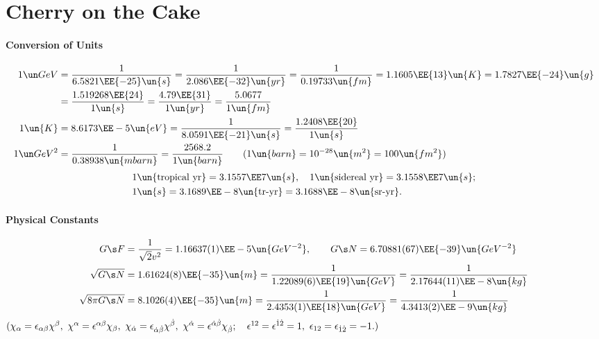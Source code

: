 
\section{Cherry on the Cake}
\paragraph{Conversion of Units}
\begin{align}
 1\GeV &= \frac1{6.5821\EE{-25}\un{s}} = \frac1{2.086\EE{-32}\un{yr}}
        = \frac1{0.19733\un{fm}}  = 1.1605\EE{13}\un{K} = 1.7827\EE{-24}\un{g}\notag\\
       &= \frac{1.519268\EE{24}}{1\un{s}} = \frac{4.79\EE{31}}{1\un{yr}}
        = \frac{5.0677}{1\un{fm}}\\
1\un{K}&= 8.6173\EE-5\un{eV} = \frac1{8.0591\EE{-21}\un{s}} = \frac{1.2408\EE{20}}{1\un{s}}\\
1\GeV^2&= \frac1{0.38938\un{mbarn}} = \frac{2568.2}{1\un{barn}}\qquad(1\un{barn}=10^{-28}\un{m^2} = 100\un{fm^2})
\end{align}
\vspace{-2zw}
\begin{equation}\begin{split}
 &1\un{\text{tropical yr}} = 3.1557\EE7\un{s},\quad 1\un{\text{sidereal yr}} = 3.1558\EE7\un{s};\\
 &1\un{s} = 3.1689\EE-8\un{\text{tr-yr}} = 3.1688\EE-8\un{\text{sr-yr}}.
\end{split}\end{equation}
\paragraph{Physical Constants}
\begin{align}
 G\s F &= \frac{1}{\sqrt2v^2} = 1.16637(1)\EE-5\un{GeV^{-2}},\qquad
 G\s N = 6.70881(67)\EE{-39}\un{GeV^{-2}}\\
 \sqrt{G\s N} &= 1.61624(8)\EE{-35}\un{m} = \frac1{1.22089(6)\EE{19}\un{GeV}}
               = \frac1{2.17644(11)\EE-8\un{kg}}\\
 \sqrt{8\pi G\s N}&= 8.1026(4)\EE{-35}\un{m} = \frac1{2.4353(1)\EE{18}\un{GeV}}
                   = \frac1{4.3413(2)\EE-9\un{kg}}
\end{align}
$(\chi_\alpha=\epsilon_{\alpha\beta}\chi^\beta,\
  \chi^\alpha=\epsilon^{\alpha\beta}\chi_\beta,\
  \chi_{\dot\alpha}=\epsilon_{{\dot\alpha}{\dot\beta}}\chi^{\dot\beta},\
  \chi^{\dot\alpha}=\epsilon^{{\dot\alpha}{\dot\beta}}\chi_{\dot\beta};\quad
  \epsilon^{12}=\epsilon^{\dot1\dot2}=1, \
  \epsilon_{12}=\epsilon_{\dot1\dot2}=-1.)$

